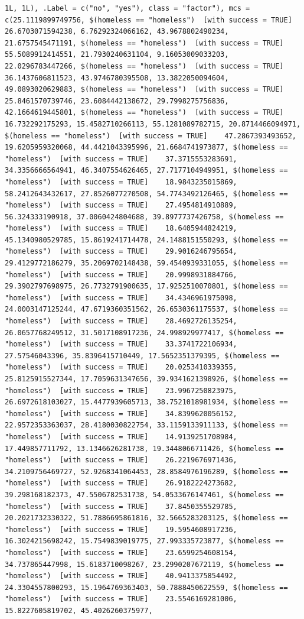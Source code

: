 \documentclass{tufte-book}\usepackage[]{graphicx}\usepackage[]{xcolor}
\makeatletter
\newenvironment{kframe}{%
 \def\at@end@of@kframe{}%
 \ifinner\ifhmode%
  \def\at@end@of@kframe{\end{minipage}}%
  \begin{minipage}{\columnwidth}%
 \fi\fi%
 \def\FrameCommand##1{\hskip\@totalleftmargin \hskip-\fboxsep
 \colorbox{shadecolor}{##1}\hskip-\fboxsep
     \hskip-\linewidth \hskip-\@totalleftmargin \hskip\columnwidth}%
 \MakeFramed {\advance\hsize-\width
   \@totalleftmargin\z@ \linewidth\hsize
   \@setminipage}}%
 {\par\unskip\endMakeFramed%
 \at@end@of@kframe}
\newenvironment{knitrout}{}{} %
\makeatother
\begin{document}
\begin{knitrout}
\begin{kframe}
\begin{verbatim}
1L, 1L), .Label = c("no", "yes"), class = "factor"), mcs = c(25.1119899749756, $(homeless == "homeless")  [with success = TRUE]    26.6703071594238, 6.76292324066162, 43.9678802490234, 21.6757545471191, $(homeless == "homeless")  [with success = TRUE]    55.5089912414551, 21.7930240631104, 9.16053009033203, 22.0296783447266, $(homeless == "homeless")  [with success = TRUE]    36.1437606811523, 43.9746780395508, 13.3822050094604, 49.0893020629883, $(homeless == "homeless")  [with success = TRUE]    25.8461570739746, 23.6084442138672, 29.7998275756836, 42.1664619445801, $(homeless == "homeless")  [with success = TRUE]    16.732292175293, 15.4582710266113, 55.1281089782715, 20.8714466094971, $(homeless == "homeless")  [with success = TRUE]    47.2867393493652, 19.6205959320068, 44.4421043395996, 21.6684741973877, $(homeless == "homeless")  [with success = TRUE]    37.3715553283691, 34.3356666564941, 46.3407554626465, 27.7177104949951, $(homeless == "homeless")  [with success = TRUE]    18.9843235015869, 58.2412643432617, 27.8526077270508, 54.7743492126465, $(homeless == "homeless")  [with success = TRUE]    27.4954814910889, 56.324333190918, 37.0060424804688, 39.8977737426758, $(homeless == "homeless")  [with success = TRUE]    18.6405944824219, 45.1340980529785, 15.8619241714478, 24.1488151550293, $(homeless == "homeless")  [with success = TRUE]    29.9016246795654, 29.4129772186279, 35.2069702148438, 59.4540939331055, $(homeless == "homeless")  [with success = TRUE]    20.9998931884766, 29.3902797698975, 26.7732791900635, 17.9252510070801, $(homeless == "homeless")  [with success = TRUE]    34.4346961975098, 24.0003147125244, 47.6719360351562, 26.6530361175537, $(homeless == "homeless")  [with success = TRUE]    28.4692726135254, 26.0657768249512, 31.5017108917236, 24.998929977417, $(homeless == "homeless")  [with success = TRUE]    33.3741722106934, 27.57546043396, 35.8396415710449, 17.5652351379395, $(homeless == "homeless")  [with success = TRUE]    20.0253410339355, 25.8125915527344, 17.7059631347656, 39.9341621398926, $(homeless == "homeless")  [with success = TRUE]    23.9967250823975, 26.6972618103027, 15.4477939605713, 38.7521018981934, $(homeless == "homeless")  [with success = TRUE]    34.8399620056152, 22.9572353363037, 28.4180030822754, 33.1159133911133, $(homeless == "homeless")  [with success = TRUE]    14.9139251708984, 17.449857711792, 13.1346626281738, 19.3448066711426, $(homeless == "homeless")  [with success = TRUE]    26.2219676971436, 34.2109756469727, 52.9268341064453, 28.8584976196289, $(homeless == "homeless")  [with success = TRUE]    26.9182224273682, 39.298168182373, 47.5506782531738, 54.0533676147461, $(homeless == "homeless")  [with success = TRUE]    37.8450355529785, 20.2021732330322, 51.7886695861816, 32.5665283203125, $(homeless == "homeless")  [with success = TRUE]    19.5954608917236, 16.3024215698242, 15.7549839019775, 27.993335723877, $(homeless == "homeless")  [with success = TRUE]    23.6599254608154, 34.737865447998, 15.6183710098267, 23.2990207672119, $(homeless == "homeless")  [with success = TRUE]    40.9413375854492, 24.3304557800293, 15.1964769363403, 50.7888450622559, $(homeless == "homeless")  [with success = TRUE]    23.5546169281006, 15.8227605819702, 45.4026260375977, 
\end{verbatim}
\end{kframe}
\end{knitrout}
\end{document}
